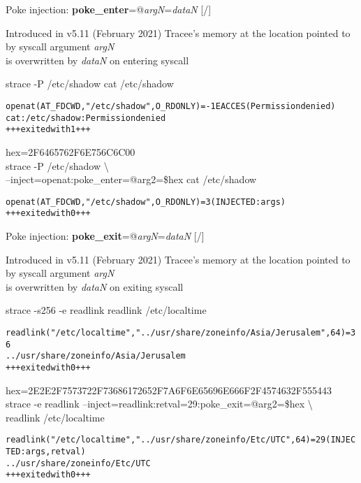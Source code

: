 \documentclass[unicode,aspectratio=169,xcolor={table,dvipsnames,usernames}]{beamer}
\begin{document}
\begin{frame}[fragile]{Poke injection: \textbf{poke\_enter}=@\textit{argN}=\textit{dataN} \hfill [\insertframenumber/\inserttotalframenumber]}
\begin{block}{Introduced in v5.11 (February 2021)}
\large
Tracee's memory at the location pointed to by syscall argument \textit{argN} \\ is overwritten by \textit{dataN} on entering syscall
\end{block}

\begin{block}{strace -P /etc/shadow cat /etc/shadow}
\begin{alltt}
openat(AT_FDCWD, "/etc/shadow", O_RDONLY) = -1 EACCES (Permission denied)
cat: /etc/shadow: Permission denied
+++ exited with 1 +++
\end{alltt}
\end{block}

\begin{block}{hex=2F6465762F6E756C6C00 \\ strace -P /etc/shadow \textbackslash \\ --inject=openat:poke\_enter=@arg2=\$hex cat /etc/shadow}
\begin{alltt}
openat(AT_FDCWD, "/etc/shadow", O_RDONLY) = 3 (INJECTED: args)
+++ exited with 0 +++
\end{alltt}
\end{block}
\end{frame}

\begin{frame}[fragile]{Poke injection: \textbf{poke\_exit}=@\textit{argN}=\textit{dataN} \hfill [\insertframenumber/\inserttotalframenumber]}
\begin{block}{Introduced in v5.11 (February 2021)}
\large
Tracee's memory at the location pointed to by syscall argument \textit{argN} \\ is overwritten by \textit{dataN} on exiting syscall
\end{block}

\begin{block}{strace -s256 -e readlink readlink /etc/localtime}
\small
\begin{alltt}
readlink("/etc/localtime", "../usr/share/zoneinfo/Asia/Jerusalem", 64) = 36
../usr/share/zoneinfo/Asia/Jerusalem
+++ exited with 0 +++
\end{alltt}
\end{block}

\begin{block}{hex=2E2E2F7573722F73686172652F7A6F6E65696E666F2F4574632F555443 \\ strace -e readlink --inject=readlink:retval=29:poke\_exit=@arg2=\$hex \textbackslash \\ readlink /etc/localtime}
\scriptsize
\begin{alltt}
readlink("/etc/localtime", "../usr/share/zoneinfo/Etc/UTC", 64) = 29 (INJECTED: args, retval)
../usr/share/zoneinfo/Etc/UTC
+++ exited with 0 +++
\end{alltt}
\end{block}
\end{frame}
\end{document}
